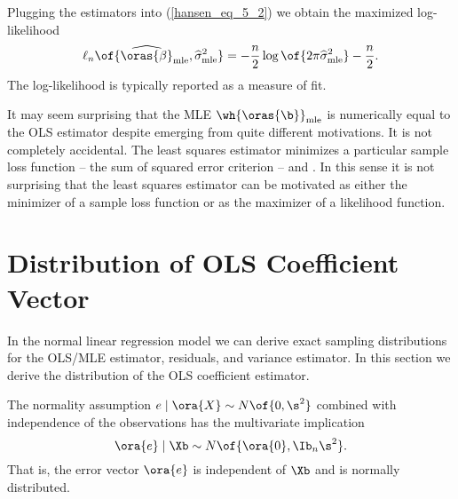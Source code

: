 Plugging the estimators into (\ref{hansen_eq_5_2}) we obtain the maximized log-likelihood 
\begin{equation}
    \label{hansen_eq_5_6}
    \ell_n\of{\widehat{\oras{\beta}}_{\text{mle}}, \widehat{\sigma}_{\text{mle}}^2} = -\frac{n}{2} \log\of{2 \pi \widehat{\sigma}_{\text{mle}}^2} - \frac{n}{2}.
\end{equation}
The log-likelihood is typically reported as a measure of fit. 

It may seem surprising that the MLE $\wh{\oras{\b}}_{\text{mle}}$ is numerically equal to the OLS estimator despite emerging from quite different motivations. It is not completely accidental. The least squares estimator minimizes a particular sample loss function -- the sum of squared error criterion -- and . In this sense it is not surprising that the least squares estimator can be motivated as either the minimizer of a sample loss function or as the maximizer of a likelihood function.


\section{Distribution of OLS Coefficient Vector}

In the normal linear regression model we can derive exact sampling distributions for the OLS/MLE estimator, residuals, and variance estimator. In this section we derive the distribution of the OLS coefficient estimator.

The normality assumption $e \mid \ora{X} \sim N\of{0, \s^2}$ combined with independence of the observations has the multivariate implication 
\begin{equation}
    \notag
    \ora{e} \mid \Xb \sim N\of{\ora{0}, \Ib_n \s^2}.
\end{equation}
That is, the error vector $\ora{e}$ is independent of $\Xb$ and is normally distributed.

